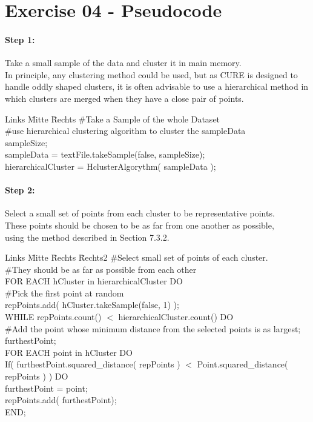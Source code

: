 \documentclass[11pt,a4paper]{scrartcl}
\begin{document}
\section*{Exercise 04 - Pseudocode}
\paragraph{Step 1:}
Take a small sample of the data and cluster it in main memory.\\
In principle, any clustering method could be used, but as CURE is designed to handle oddly shaped clusters, it is often advisable to use a hierarchical method in which clusters are merged when they have a close pair of points.
\begin{tabbing}
Links \= Mitte \= Rechts \kill
\>	\#Take a Sample of the whole Dataset\\
\>	\#use hierarchical clustering algorithm to cluster the sampleData\\
\> \>	 sampleSize;\\
\> \> 	sampleData = textFile.takeSample(false, sampleSize);\\
\> \>	hierarchicalCluster = HclusterAlgorythm( sampleData );
\end{tabbing}
\paragraph{Step 2:}
Select a small set of points from each cluster to be representative points. \\
These points should be chosen to be as far from one another as possible, \\
using the method described in Section 7.3.2.
\begin{tabbing}
Links \= Mitte \= Rechts  \=Rechts2 \kill
\#Select small set of points of each cluster. \\
\#They should be as far as possible from each other\\
FOR EACH hCluster in hierarchicalCluster DO\\
\>\#Pick the first point at random\\
\>\>	repPoints.add( hCluster.takeSample(false, 1) );\\
\>WHILE repPoints.count() $<$ hierarchicalCluster.count() DO\\
\>\#Add the point whose minimum distance from the selected points is as largest; \\
\>furthestPoint;\\
\>FOR EACH point in hCluster DO\\
\> \>		If( furthestPoint.squared\_distance( repPoints ) $<$ 
			Point.squared\_distance( repPoints ) ) DO\\
\> \>	\>		furthestPoint = point;\\
\>repPoints.add( furthestPoint);\\
END;
\end{tabbing}
\end{document}
